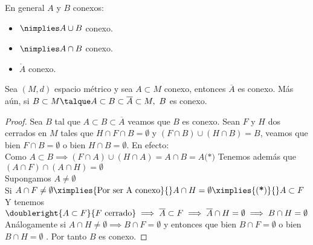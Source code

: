 	\begin{observacion} En general $A$ y $B$ conexos:
		\begin{itemize}
			\item $\nimplies A\cup B$ conexo.
			\item $\nimplies A\cap B$ conexo.
			\item $\mathring{A}$ conexo.
		\end{itemize}
	\end{observacion}
	
	\begin{proposicion} Sea $(M,d)$ espacio métrico y sea $A\subset M$ conexo, entonces $\overline{A}$ es conexo. Más aún, si $B\subset M\talque A\subset B\subset \overline{A}\subset M,\ B$ es conexo.
		\begin{proof}
			Sea $B$ tal que $A\subset B\subset \overline{A}$ veamos que $B$ es conexo.
			Sean $F$ y $H$ dos cerrados en $M$ tales que $H\cap F \cap B =\emptyset$ y $(F\cap B)\cup (H\cap B) = B$, veamos que bien $F\cap B=\emptyset$ o bien $H\cap B=\emptyset$. En efecto:\\ Como $A \subset B \implies \boxed{(F\cap A)\cup (H\cap A) = A\cap B = A}\textbf{(*)}$ Tenemos además que\\ $(A\cap F)\cap(A\cap H)=\emptyset$\\
			Supongamos $A\neq\emptyset$\\
			Si $A\cap F \neq \emptyset \ximplies{\mathrm{Por\ ser\ A\ conexo}}{} A\cap H=\emptyset\ximplies{(\textbf{*})}{}A\subset F$\\
			Y tenemos $\doubleright{A\subset F}{F\mathrm{\ cerrado}}\implies\overline{A}\subset F\implies \overline{A}\cap H=\emptyset\implies B\cap H=\emptyset$\\
			Análogamente si $ A\cap H\neq\emptyset\implies B\cap F = \emptyset$ y entonces que bien $B\cap F = \emptyset$ o bien $B\cap H =\emptyset$	. Por tanto $B$ es conexo.
		\end{proof}		
	\end{proposicion}
	  
